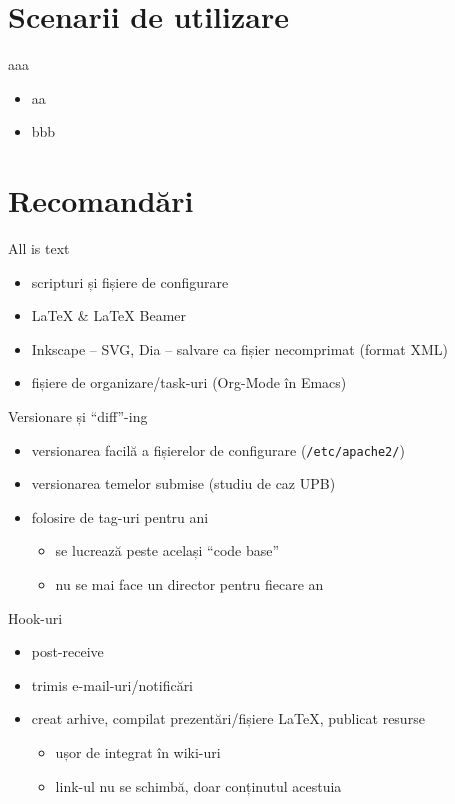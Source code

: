 \documentclass{beamer}
\begin{document}
\section{Scenarii de utilizare}

\frame{\tableofcontents[currentsection]}

\begin{frame}{aaa}
	\begin{itemize}
		\item aa
		\item bbb
	\end{itemize}
\end{frame}

\section{Recomandări}

\begin{frame}{All is text}
	\begin{itemize}
		\item scripturi și fișiere de configurare
		\item LaTeX \& LaTeX Beamer
		\item Inkscape -- SVG, Dia -- salvare ca fișier necomprimat (format
		XML)
		\item fișiere de organizare/task-uri (Org-Mode în Emacs)
	\end{itemize}
\end{frame}

\begin{frame}{Versionare și ``diff''-ing}
	\begin{itemize}
		\item versionarea facilă a fișierelor de configurare
		(\texttt{/etc/apache2/})
		\item versionarea temelor submise (studiu de caz UPB)
		\item folosire de tag-uri pentru ani
			\begin{itemize}
				\item se lucrează peste același ``code base''
				\item nu se mai face un director pentru fiecare an
			\end{itemize}
	\end{itemize}
\end{frame}

\begin{frame}{Hook-uri}
	\begin{itemize}
		\item post-receive
		\item trimis e-mail-uri/notificări
		\item creat arhive, compilat prezentări/fișiere LaTeX, publicat
		resurse
			\begin{itemize}
				\item ușor de integrat în wiki-uri
				\item link-ul nu se schimbă, doar conținutul acestuia
			\end{itemize}
	\end{itemize}
\end{frame}
\end{document}
